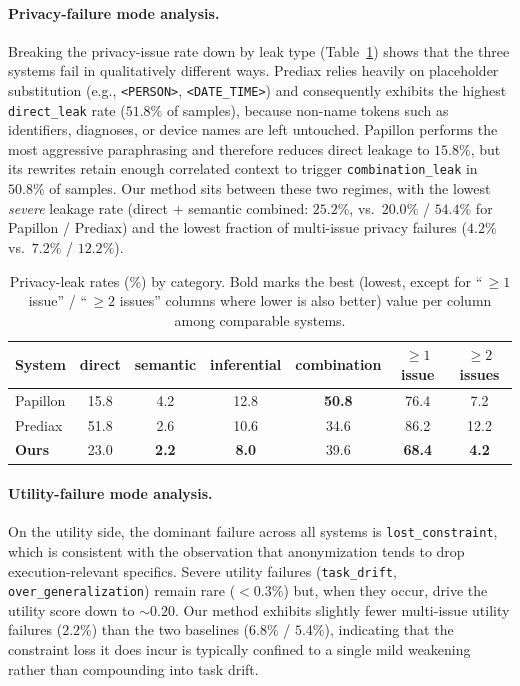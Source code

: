 \paragraph{Privacy-failure mode analysis.}
Breaking the privacy-issue rate down by leak type
(Table~\ref{tab:leaks}) shows that the three systems fail in
qualitatively different ways. Prediax relies heavily on placeholder
substitution (e.g., \texttt{<PERSON>}, \texttt{<DATE\_TIME>}) and
consequently exhibits the highest \texttt{direct\_leak} rate
($51.8\%$ of samples), because non-name tokens such as identifiers,
diagnoses, or device names are left untouched. Papillon performs the
most aggressive paraphrasing and therefore reduces direct leakage to
$15.8\%$, but its rewrites retain enough correlated context to trigger
\texttt{combination\_leak} in $50.8\%$ of samples. Our method sits
between these two regimes, with the lowest \emph{severe} leakage rate
(direct $+$ semantic combined: $25.2\%$, vs.\ $20.0\%$ / $54.4\%$ for
Papillon / Prediax) and the lowest fraction of multi-issue privacy
failures ($4.2\%$ vs.\ $7.2\%$ / $12.2\%$).

\begin{table}[t]
  \centering
  \small
  \caption{Privacy-leak rates (\%) by category. Bold marks the best
  (lowest, except for ``\,$\ge 1$ issue'' / ``\,$\ge 2$ issues'' columns
  where lower is also better) value per column among comparable systems.}
  \label{tab:leaks}
  \begin{tabular}{lcccccc}
    \toprule
    System   & direct        & semantic     & inferential  & combination   & $\ge 1$ issue   & $\ge 2$ issues \\
    \midrule
    Papillon & 15.8          & 4.2          & 12.8         & \textbf{50.8} & 76.4            & 7.2            \\
    Prediax  & 51.8          & 2.6          & 10.6         & 34.6          & 86.2            & 12.2           \\
    \textbf{Ours} & 23.0     & \textbf{2.2} & \textbf{8.0} & 39.6          & \textbf{68.4}   & \textbf{4.2}   \\
    \bottomrule
  \end{tabular}
\end{table}

\paragraph{Utility-failure mode analysis.}
On the utility side, the dominant failure across all systems is
\texttt{lost\_constraint}, which is consistent with the observation
that anonymization tends to drop execution-relevant specifics. Severe
utility failures (\texttt{task\_drift}, \texttt{over\_generalization})
remain rare ($<0.3\%$) but, when they occur, drive the utility score
down to ${\sim}0.20$. Our method exhibits slightly fewer multi-issue
utility failures ($2.2\%$) than the two baselines ($6.8\%$ / $5.4\%$),
indicating that the constraint loss it does incur is typically
confined to a single mild weakening rather than compounding into task
drift.

